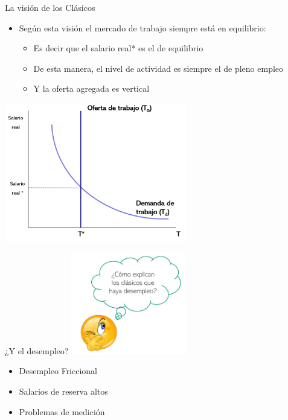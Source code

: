 \documentclass{beamer}
\begin{document}
\begin{frame}{La visión de los Clásicos}
\begin{itemize}
    \item Según esta visión el mercado de trabajo siempre está en equilibrio:
    \vspace{2mm}
    \begin{itemize}
    \scriptsize\item Es decir que el salario real* es el de equilibrio
    \scriptsize\item De esta manera, el nivel de actividad es siempre el de pleno empleo
    \scriptsize \item Y la oferta agregada es vertical
    \end{itemize}
\end{itemize}
\centering\includegraphics[width=8cm]{Figures/P29.png}\
\end{frame}


\begin{frame}{¿Y el desempleo?}
    \centering\includegraphics[width=5cm]{Figures/P29b.png}\
\begin{itemize}
\item Desempleo Friccional
\item Salarios de reserva altos
\item Problemas de medición
\end{itemize}
\end{frame}
\end{document}
